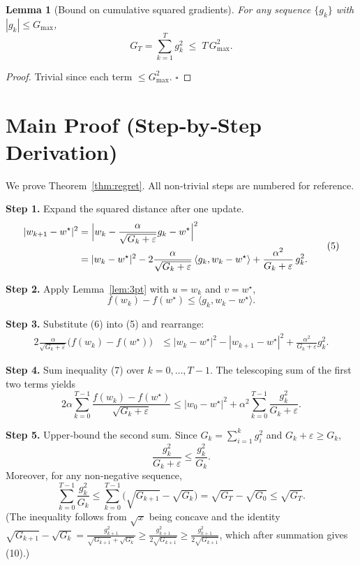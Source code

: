 \documentclass{article}
\newtheorem{lemma}{Lemma}
\begin{document}
\begin{lemma}[Bound on cumulative squared gradients]\label{lem:sq}
For any sequence $\{g_k\}$ with $|g_k|\le G_{\max}$,
\[
G_T=\sum_{k=1}^{T}g_k^{2}\;\le\;T\,G_{\max}^{2}.
\tag{4}
\]
\end{lemma}
\begin{proof}
Trivial since each term $\le G_{\max}^{2}$. $\square$
\end{proof}

\section*{Main Proof (Step‑by‑Step Derivation)}
We prove Theorem~\ref{thm:regret}.  
All non‑trivial steps are numbered for reference.

\noindent\textbf{Step 1.}  Expand the squared distance after one update.
\[
\begin{aligned}
|w_{k+1}-w^{\star}|^{2}
&= \Bigl|w_{k}-\frac{\alpha}{\sqrt{G_{k}+\varepsilon}}g_{k}-w^{\star}\Bigr|^{2}\\
&=|w_{k}-w^{\star}|^{2}
-2\frac{\alpha}{\sqrt{G_{k}+\varepsilon}}\,\langle g_{k},w_{k}-w^{\star}\rangle
+\frac{\alpha^{2}}{G_{k}+\varepsilon}\,g_{k}^{2}.
\end{aligned}
\tag{5}
\]

\noindent\textbf{Step 2.}  Apply Lemma~\ref{lem:3pt} with $u=w_{k}$ and $v=w^{\star}$,
\[
f(w_{k})-f(w^{\star})\le\langle g_{k},w_{k}-w^{\star}\rangle .
\tag{6}
\]

\noindent\textbf{Step 3.}  Substitute (6) into (5) and rearrange:
\[
\begin{aligned}
2\frac{\alpha}{\sqrt{G_{k}+\varepsilon}}\bigl(f(w_{k})-f(w^{\star})\bigr)
&\le |w_{k}-w^{\star}|^{2}-|w_{k+1}-w^{\star}|^{2}
+\frac{\alpha^{2}}{G_{k}+\varepsilon}g_{k}^{2}.
\end{aligned}
\tag{7}
\]

\noindent\textbf{Step 4.}  Sum inequality (7) over $k=0,\dots,T-1$.
The telescoping sum of the first two terms yields
\[
2\alpha\sum_{k=0}^{T-1}\frac{f(w_{k})-f(w^{\star})}{\sqrt{G_{k}+\varepsilon}}
\le |w_{0}-w^{\star}|^{2}
+\alpha^{2}\sum_{k=0}^{T-1}\frac{g_{k}^{2}}{G_{k}+\varepsilon}.
\tag{8}
\]

\noindent\textbf{Step 5.}  Upper‑bound the second sum.  
Since $G_{k}= \sum_{i=1}^{k}g_{i}^{2}$ and $G_{k}+\varepsilon\ge G_{k}$,
\[
\frac{g_{k}^{2}}{G_{k}+\varepsilon}\le
\frac{g_{k}^{2}}{G_{k}}.
\tag{9}
\]
Moreover, for any non‑negative sequence,
\[
\sum_{k=0}^{T-1}\frac{g_{k}^{2}}{G_{k}}
\le \sum_{k=0}^{T-1}\bigl(\sqrt{G_{k+1}}-\sqrt{G_{k}}\bigr)
= \sqrt{G_{T}}-\sqrt{G_{0}}
\le \sqrt{G_{T}} .
\tag{10}
\]
(The inequality follows from $\sqrt{x}$ being concave and the identity
$\sqrt{G_{k+1}}-\sqrt{G_{k}}=\frac{g_{k+1}^{2}}{\sqrt{G_{k+1}}+\sqrt{G_{k}}}
\ge\frac{g_{k+1}^{2}}{2\sqrt{G_{k+1}}}\ge\frac{g_{k+1}^{2}}{2\sqrt{G_{k+1}}}$, which after summation gives (10).)
\end{document}
